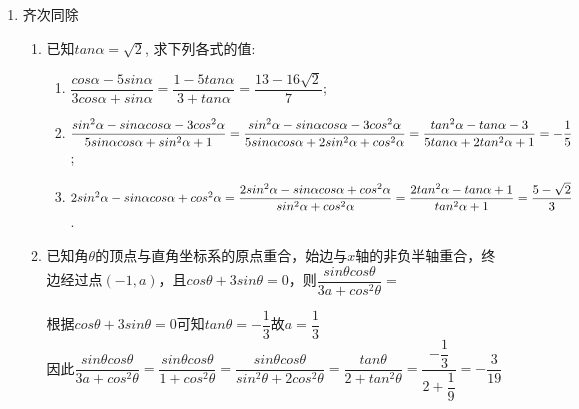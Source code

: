 \begin{enumerate}
\begin{enumerate}
\begin{jieda}
        \end{jieda}
    \end{enumerate}
    \item 齐次同除
    \begin{enumerate}
        \item 已知$tan\alpha=\sqrt{2}$, 求下列各式的值: \\
        \begin{jieda}
        \begin{enumerate}[1.]
        \item $\dfrac{cos\alpha-5sin\alpha}{3cos\alpha+sin\alpha} = \dfrac{1-5tan\alpha}{3+tan\alpha} = \dfrac{13-16\sqrt2}{7}$; 
        \item $\dfrac{sin^2\alpha-sin\alpha cos\alpha-3cos^2\alpha}{5sin\alpha cos\alpha+sin^2\alpha+1} = \dfrac{sin^2\alpha-sin\alpha cos\alpha-3cos^2\alpha}{5sin\alpha cos\alpha+2sin^2\alpha+cos^2\alpha} \\
        = \dfrac{tan^2\alpha-tan\alpha -3}{5 tan\alpha+2tan^2\alpha + 1} = -\dfrac{1}{5}$; 
        \item $2sin^2\alpha-sin\alpha cos\alpha+cos^2\alpha = \dfrac{2sin^2\alpha-sin\alpha cos\alpha+cos^2\alpha}{sin^2\alpha + cos^2\alpha} \\
        = \dfrac{2tan^2\alpha-tan\alpha+1}{tan^2\alpha + 1} = \dfrac{5-\sqrt{2}}{3}$. 
        \end{enumerate}
        \end{jieda}   
        \item 已知角$\theta$的顶点与直角坐标系的原点重合，始边与$x$轴的非负半轴重合，终边经过点$(-1, a)$，且$cos\theta + 3 sin\theta = 0$，则$\dfrac{sin\theta cos\theta}{3a+cos^2\theta}=$
        \begin{jieda}
            根据$cos\theta + 3 sin\theta = 0$可知$tan\theta = -\dfrac{1}{3}$故$a = \dfrac{1}{3}$ \\
            因此$\dfrac{sin\theta cos\theta}{3a+cos^2\theta} = \dfrac{sin\theta cos\theta}{1+cos^2\theta} = \dfrac{sin\theta cos\theta}{sin^2\theta + 2cos^2\theta} = \dfrac{tan\theta}{2 + tan^2\theta} = \dfrac{-\dfrac{1}{3}}{2 + \dfrac{1}{9}} = -\dfrac{3}{19}$

\end{jieda}
\end{enumerate}
\end{enumerate}
